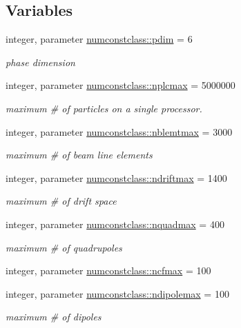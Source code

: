 \subsection*{Variables}
\begin{DoxyCompactItemize}
\item 
integer, parameter \mbox{\hyperlink{namespacenumconstclass_a24da80ebccca40a65c454aff1bd28e7f}{numconstclass\+::pdim}} = 6
\begin{DoxyCompactList}\small\item\em phase dimension \end{DoxyCompactList}\item 
integer, parameter \mbox{\hyperlink{namespacenumconstclass_a6bb8beba48502784bfcd08114a616b9b}{numconstclass\+::nplcmax}} = 5000000
\begin{DoxyCompactList}\small\item\em maximum \# of particles on a single processor. \end{DoxyCompactList}\item 
integer, parameter \mbox{\hyperlink{namespacenumconstclass_a83ab51ec1dd55c167600999fca072524}{numconstclass\+::nblemtmax}} = 3000
\begin{DoxyCompactList}\small\item\em maximum \# of beam line elements \end{DoxyCompactList}\item 
integer, parameter \mbox{\hyperlink{namespacenumconstclass_a22030f070a90c877bef951b411dac428}{numconstclass\+::ndriftmax}} = 1400
\begin{DoxyCompactList}\small\item\em maximum \# of drift space \end{DoxyCompactList}\item 
integer, parameter \mbox{\hyperlink{namespacenumconstclass_a93ef59ed830442249dee14d677ddeb08}{numconstclass\+::nquadmax}} = 400
\begin{DoxyCompactList}\small\item\em maximum \# of quadrupoles \end{DoxyCompactList}\item 
integer, parameter \mbox{\hyperlink{namespacenumconstclass_a94e49bcdcfdd3ed05de0d41af396f4d1}{numconstclass\+::ncfmax}} = 100
\item 
integer, parameter \mbox{\hyperlink{namespacenumconstclass_a35f5d91828a6dc16c619583554a1566d}{numconstclass\+::ndipolemax}} = 100
\begin{DoxyCompactList}\small\item\em maximum \# of dipoles \end{DoxyCompactList}\item 

\end{DoxyCompactItemize}
